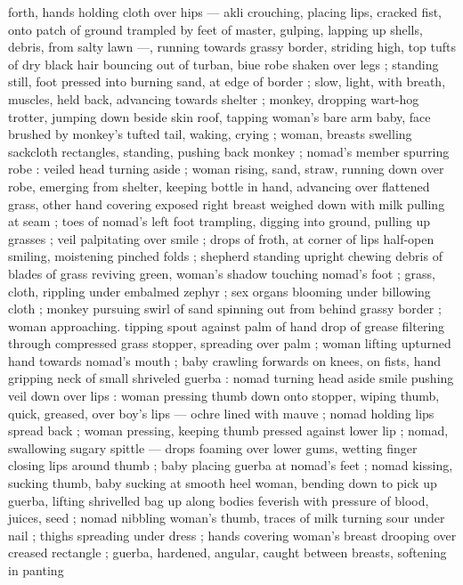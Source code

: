forth, hands holding cloth over hips --- akli crouching, placing lips, 
cracked fist, onto patch of ground trampled by feet of master, 
gulping, lapping up shells, debris, from salty lawn ---, running 
towards grassy border, striding high, top tufts of dry black hair 
bouncing out of turban, biue robe shaken over legs ; standing still, 
foot pressed into burning sand, at edge of border ; slow, light, with 
breath, muscles, held back, advancing towards shelter ; monkey, 
dropping wart-hog trotter, jumping down beside skin roof, tapping 
woman's bare arm {\col} baby, face brushed by monkey's tufted tail, 
waking, crying ; woman, breasts swelling sackcloth rectangles, 
standing, pushing back monkey ; nomad's member spurring robe : 
veiled head turning aside ; woman rising, sand, straw, running down 
over robe, emerging from shelter, keeping bottle in hand, advancing 
over flattened grass, other hand covering exposed right breast 
weighed down with milk pulling at seam ; toes of nomad's left foot 
trampling, digging into ground, pulling up grasses ; veil palpitating 
over smile ; drops of froth, at corner of lips half-open smiling, 
moistening pinched folds ; shepherd standing upright chewing debris 
of blades of grass reviving green, woman's shadow touching 
nomad's foot ; grass, cloth, rippling under embalmed zephyr ; sex 
organs blooming under billowing cloth ; monkey pursuing swirl of 
sand spinning out from behind grassy border ; woman approaching. 
tipping spout against palm of hand {\col} drop of grease filtering through 
compressed grass stopper, spreading over palm ; woman lifting 
upturned hand towards nomad's mouth ; baby crawling forwards on 
knees, on fists, hand gripping neck of small shriveled guerba : 
nomad turning head aside {\col} smile pushing veil down over lips : 
woman pressing thumb down onto stopper, wiping thumb, quick, 
greased, over boy's lips --- ochre lined with mauve ; nomad holding 
lips spread back ; woman pressing, keeping thumb pressed against 
lower lip ; nomad, swallowing sugary spittle --- drops foaming over 
lower gums, wetting finger {\dashcom} closing lips around thumb ; baby 
placing guerba at nomad's feet ; nomad kissing, sucking thumb, baby 
sucking at smooth heel {\col} woman, bending down to pick up guerba, 
lifting shrivelled bag up along bodies feverish with pressure of 
blood, juices, seed ; nomad nibbling woman's thumb, traces of milk 
turning sour under nail ; thighs spreading under dress ; hands 
covering woman's breast drooping over creased rectangle ; guerba,
hardened, angular, caught between breasts, softening in panting 
